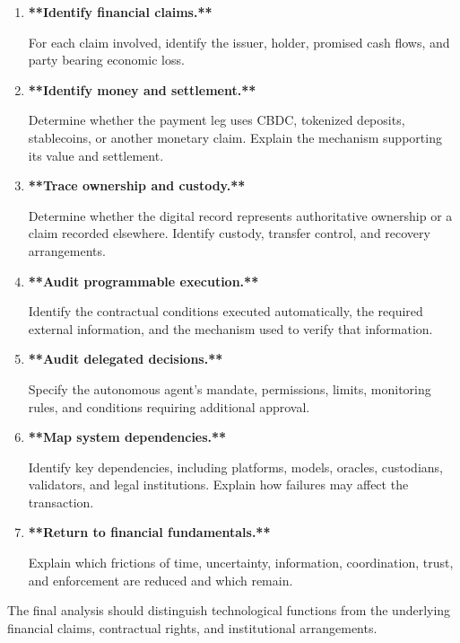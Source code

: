 \begin{enumerate}

\item \textbf{**Identify financial claims.**}

For each claim involved, identify the issuer, holder, promised cash flows, and party bearing economic loss.

\item \textbf{**Identify money and settlement.**}

Determine whether the payment leg uses CBDC, tokenized deposits, stablecoins, or another monetary claim. Explain the mechanism supporting its value and settlement.

\item \textbf{**Trace ownership and custody.**}

Determine whether the digital record represents authoritative ownership or a claim recorded elsewhere. Identify custody, transfer control, and recovery arrangements.

\item \textbf{**Audit programmable execution.**}

Identify the contractual conditions executed automatically, the required external information, and the mechanism used to verify that information.

\item \textbf{**Audit delegated decisions.**}

Specify the autonomous agent's mandate, permissions, limits, monitoring rules, and conditions requiring additional approval.

\item \textbf{**Map system dependencies.**}

Identify key dependencies, including platforms, models, oracles, custodians, validators, and legal institutions. Explain how failures may affect the transaction.

\item \textbf{**Return to financial fundamentals.**}

Explain which frictions of time, uncertainty, information, coordination, trust, and enforcement are reduced and which remain.

\end{enumerate}

The final analysis should distinguish technological functions from the underlying financial claims, contractual rights, and institutional arrangements.



